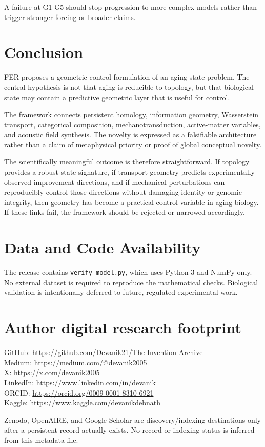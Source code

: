 \documentclass[11pt]{article}
\begin{document}
A failure at G1-G5 should stop progression to more complex models rather than trigger stronger forcing or broader claims.

\section{Conclusion}
FER proposes a geometric-control formulation of an aging-state problem. The central hypothesis is not that aging is reducible to topology, but that biological state may contain a predictive geometric layer that is useful for control.

The framework connects persistent homology, information geometry, Wasserstein transport, categorical composition, mechanotransduction, active-matter variables, and acoustic field synthesis. The novelty is expressed as a falsifiable architecture rather than a claim of metaphysical priority or proof of global conceptual novelty.

The scientifically meaningful outcome is therefore straightforward. If topology provides a robust state signature, if transport geometry predicts experimentally observed improvement directions, and if mechanical perturbations can reproducibly control those directions without damaging identity or genomic integrity, then geometry has become a practical control variable in aging biology. If these links fail, the framework should be rejected or narrowed accordingly.

\section*{Data and Code Availability}
The release contains \texttt{verify\_model.py}, which uses Python 3 and NumPy only. No external dataset is required to reproduce the mathematical checks. Biological validation is intentionally deferred to future, regulated experimental work.

\section*{Author digital research footprint}
GitHub: \url{https://github.com/Devanik21/The-Invention-Archive}\\
Medium: \url{https://medium.com/@devanik2005}\\
X: \url{https://x.com/devanik2005}\\
LinkedIn: \url{https://www.linkedin.com/in/devanik}\\
ORCID: \url{https://orcid.org/0009-0001-8310-6921}\\
Kaggle: \url{https://www.kaggle.com/devanikdebnath}

Zenodo, OpenAIRE, and Google Scholar are discovery/indexing destinations only after a persistent record actually exists. No record or indexing status is inferred from this metadata file.



\end{document}
